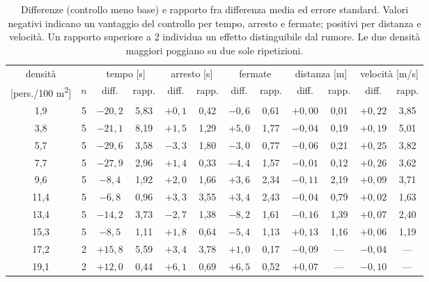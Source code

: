 \begin{table}[h]
\centering
\footnotesize
\begin{tabular}{cc|cc|cc|cc|cc|cc}
\hline
densità & & \multicolumn{2}{c|}{tempo [s]} & \multicolumn{2}{c|}{arresto [s]} & \multicolumn{2}{c|}{fermate} & \multicolumn{2}{c|}{distanza [m]} & \multicolumn{2}{c}{velocità [m/s]} \\
{[}pers./100 m\textsuperscript{2}] & $n$ & diff. & rapp. & diff. & rapp. & diff. & rapp. & diff. & rapp. & diff. & rapp. \\
\hline
1{,}9 & 5 & $-20{,}2$ & 5{,}83 & $+0{,}1$ & 0{,}42 & $-0{,}6$ & 0{,}61 & $+0{,}00$ & 0{,}01 & $+0{,}22$ & 3{,}85 \\
3{,}8 & 5 & $-21{,}1$ & 8{,}19 & $+1{,}5$ & 1{,}29 & $+5{,}0$ & 1{,}77 & $-0{,}04$ & 0{,}19 & $+0{,}19$ & 5{,}01 \\
5{,}7 & 5 & $-29{,}6$ & 3{,}58 & $-3{,}3$ & 1{,}80 & $-3{,}0$ & 0{,}77 & $-0{,}06$ & 0{,}21 & $+0{,}25$ & 3{,}82 \\
7{,}7 & 5 & $-27{,}9$ & 2{,}96 & $+1{,}4$ & 0{,}33 & $-4{,}4$ & 1{,}57 & $-0{,}01$ & 0{,}12 & $+0{,}26$ & 3{,}62 \\
9{,}6 & 5 & $-8{,}4$ & 1{,}92 & $+2{,}0$ & 1{,}66 & $+3{,}6$ & 2{,}34 & $-0{,}11$ & 2{,}19 & $+0{,}09$ & 3{,}71 \\
11{,}4 & 5 & $-6{,}8$ & 0{,}96 & $+3{,}3$ & 3{,}55 & $+3{,}4$ & 2{,}43 & $-0{,}04$ & 0{,}79 & $+0{,}02$ & 1{,}63 \\
13{,}4 & 5 & $-14{,}2$ & 3{,}73 & $-2{,}7$ & 1{,}38 & $-8{,}2$ & 1{,}61 & $-0{,}16$ & 1{,}39 & $+0{,}07$ & 2{,}40 \\
15{,}3 & 5 & $-8{,}5$ & 1{,}11 & $+1{,}8$ & 0{,}64 & $-5{,}4$ & 1{,}13 & $+0{,}13$ & 1{,}16 & $+0{,}06$ & 1{,}19 \\
17{,}2 & 2 & $+15{,}8$ & 5{,}59 & $+3{,}4$ & 3{,}78 & $+1{,}0$ & 0{,}17 & $-0{,}09$ & --- & $-0{,}04$ & --- \\
19{,}1 & 2 & $+12{,}0$ & 0{,}44 & $+6{,}1$ & 0{,}69 & $+6{,}5$ & 0{,}52 & $+0{,}07$ & --- & $-0{,}10$ & --- \\
\hline
\end{tabular}
\caption{Differenze (controllo meno base) e rapporto fra differenza media ed errore standard. Valori negativi indicano un vantaggio del controllo per tempo, arresto e fermate; positivi per distanza e velocità. Un rapporto superiore a 2 individua un effetto distinguibile dal rumore. Le due densità maggiori poggiano su due sole ripetizioni.}
\label{tab:velocita-differenze}
\end{table}
